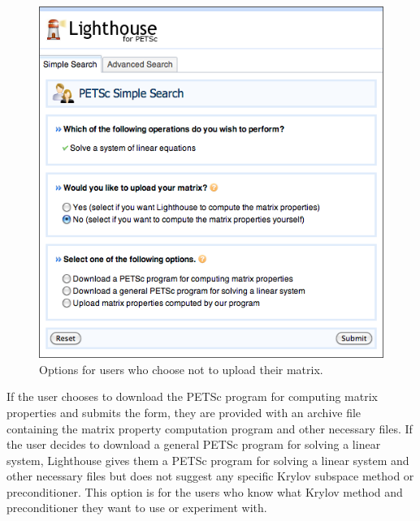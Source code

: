 \begin{figure}[h!]\label{petscui6}
  \centering
  \includegraphics[width=4.5in]{figs/petsc_6}
  \caption[Options for users who choose not to upload their matrix.]
   {Options for users who choose not to upload their matrix.}
\end{figure}

\noindent If the user chooses to download the PETSc program for computing matrix properties and submits the form, they are provided with an archive file containing the matrix property computation program and other necessary files. If the user decides to download a general PETSc program for solving a linear system, Lighthouse gives them a PETSc program for solving a linear system and other necessary files but does not suggest any specific Krylov subspace method or preconditioner. This option is for the users who know what Krylov method and preconditioner they want to use or experiment with.


